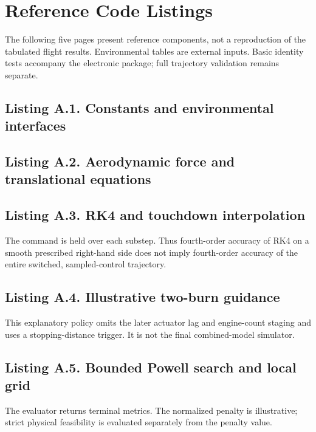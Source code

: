 \documentclass[11pt,a4paper]{article}
\begin{document}
\clearpage
\appendix
\section{Reference Code Listings}
\label{app:code}
\noindent The following five pages present reference components, not a reproduction of the tabulated flight results. Environmental tables are external inputs. Basic identity tests accompany the electronic package; full trajectory validation remains separate.
\subsection*{Listing A.1. Constants and environmental interfaces}

\clearpage
\subsection*{Listing A.2. Aerodynamic force and translational equations}

\clearpage
\subsection*{Listing A.3. RK4 and touchdown interpolation}

\noindent\small The command is held over each substep. Thus fourth-order accuracy of RK4 on a smooth prescribed right-hand side does not imply fourth-order accuracy of the entire switched, sampled-control trajectory.
\clearpage
\subsection*{Listing A.4. Illustrative two-burn guidance}

\noindent\small This explanatory policy omits the later actuator lag and engine-count staging and uses a stopping-distance trigger. It is not the final combined-model simulator.
\clearpage
\subsection*{Listing A.5. Bounded Powell search and local grid}

\noindent\small The evaluator returns terminal metrics. The normalized penalty is illustrative; strict physical feasibility is evaluated separately from the penalty value.
\normalsize
\end{document}

